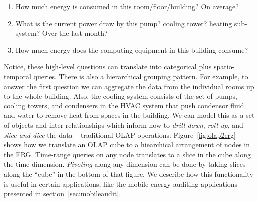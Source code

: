 \begin{enumerate}
\item How much energy is consumed in this room/floor/building?  On average?
\item What is the current power draw by this pump? cooling tower? heating sub-system?  Over
		the last month?
\item How much energy does the computing equipment in this building consume?
\end{enumerate}
\vspace{0.08in}


Notice, these high-level questions can translate into categorical plus spatio-temporal queries.
There is also a hierarchical grouping pattern.  For example, to answer the first question we can
aggregate the data from the individual rooms up to the whole building.  
Also, the cooling system consists of the set of pumps, cooling towers, and condensers in the HVAC system that push condensor
fluid and water to remove heat from spaces in the building.  We can model this as a set of objects and inter-relationships which inform how
to \emph{drill-down}, \emph{roll-up}, and \emph{slice and dice} the data -- traditional OLAP operations.
Figure~\ref{fig:olap2erg} shows how we translate an OLAP cube to a hiearchical arrangement of 
nodes in the ERG.  Time-range queries on any node translates to a slice in the cube along the time dimension.
\emph{Pivoting} along any dimension can be done by taking slices along the ``cube'' in the bottom of that
figure.  We describe how this functionality is useful in certain applications, like the mobile energy auditing 
applications presented in section~\ref{sec:mobileaudit}.

